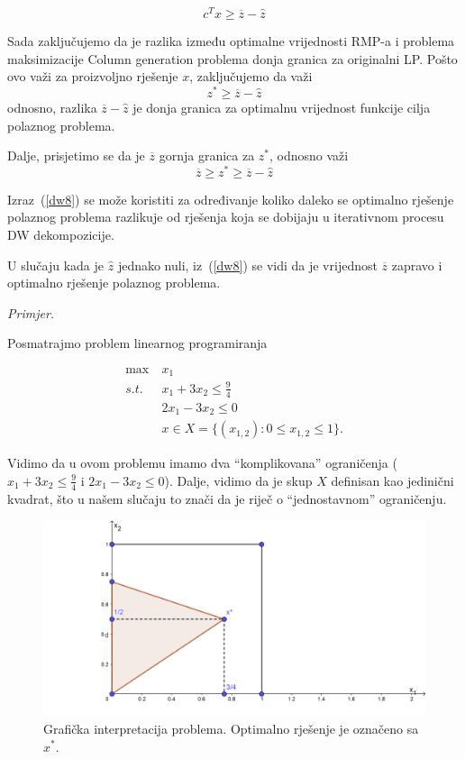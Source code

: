\documentclass[a4paper, utf8, 11pt, colorlinks]{book}
\begin{document}
 $$ c^Tx\geqslant \overline{z}-\hat{z}$$
 
 Sada zaključujemo da je razlika između optimalne vrijednosti RMP-a i problema maksimizacije Column generation problema donja granica za originalni LP. Pošto ovo važi za proizvoljno rješenje $x$, zaključujemo da važi 
 $$z^*\geqslant \overline{z}-\hat{z}$$
 odnosno, razlika $\overline{z}-\hat{z}$ je donja granica za optimalnu vrijednost funkcije cilja polaznog problema.
 
 Dalje, prisjetimo se da je $\overline{z}$ gornja granica za $z^*$, odnosno važi 
\begin{equation}\label{dw8}
	  \overline{z}\geqslant z^*\geqslant \overline{z}-\hat{z}
\end{equation}
 
 Izraz~(\ref{dw8}) se može koristiti za određivanje koliko daleko se optimalno rješenje polaznog problema razlikuje od rješenja koja se dobijaju u iterativnom procesu DW dekompozicije.
 
 U slučaju kada je $\hat{z}$ jednako nuli, iz~(\ref{dw8}) se vidi da je vrijednost $\overline{z}$ zapravo i optimalno rješenje polaznog problema.
 
 \emph{Primjer.}%
 
 Posmatrajmo problem linearnog programiranja
 
   \begin{equation}
 	\begin{aligned}\label{primjer:dw1}
 		\max\  &x_1\\
 		s.t.\  &x_1+3x_2\leqslant \frac94\\
 		 &2x_1-3x_2\leqslant 0\\
 		&x \in X=\{(x_{1,2}):0\leqslant x_{1, 2}  \leqslant 1\}.
 	\end{aligned}
 \end{equation}
 
 Vidimo da u ovom problemu imamo dva ``komplikovana'' ograničenja ($x_1+3x_2\leqslant \frac94$ i
 $2x_1-3x_2\leqslant 0$). Dalje, vidimo da je skup $X$ definisan kao jedinični kvadrat, što u našem slučaju to znači da je riječ o ``jednostavnom'' ograničenju. 
 
 \begin{figure}\label{fig:dw1}
 	
 	\includegraphics[scale=4]{dw2.png}
 	\caption{Grafička interpretacija problema. Optimalno rješenje je označeno sa $x^*$. }
 	\label{fig:dw1}
 \end{figure}
 
\end{document}
